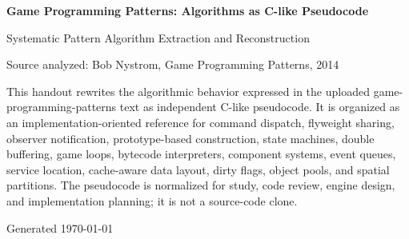 \documentclass[10pt,letterpaper]{article}
\newcommand{\handouttitle}{Game Programming Patterns: Algorithms as C-like Pseudocode}
\begin{document}
\begin{titlepage}
\centering
\vspace*{0.82in}
{\Huge\bfseries\color{HouseBlue}\handouttitle\par}
\vspace{0.20in}
{\Large Systematic Pattern Algorithm Extraction and Reconstruction\par}
\vspace{0.32in}
{\large Source analyzed: Bob Nystrom, Game Programming Patterns, 2014\par}
\vfill
\begin{minipage}{0.88\textwidth}
\small
This handout rewrites the algorithmic behavior expressed in the uploaded game-programming-patterns text as independent C-like pseudocode. It is organized as an implementation-oriented reference for command dispatch, flyweight sharing, observer notification, prototype-based construction, state machines, double buffering, game loops, bytecode interpreters, component systems, event queues, service location, cache-aware data layout, dirty flags, object pools, and spatial partitions. The pseudocode is normalized for study, code review, engine design, and implementation planning; it is not a source-code clone.
\end{minipage}
\vfill
{\large Generated \today\par}
\end{titlepage}
\clearpage
{}
\tableofcontents
\clearpage
{}
\end{document}
